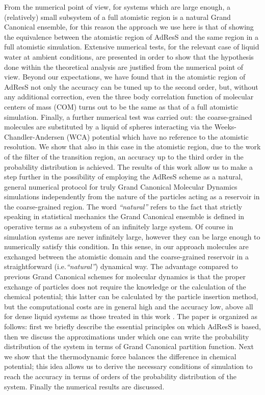 \documentclass[aip,jcp,a4paper,reprint,onecolumn]{revtex4-1}
\begin{document}
From the numerical point of view, for systems which are large enough, a (relatively) small subsystem of a full atomistic region is a 
natural Grand Canonical ensemble, for this reason the approach we use here is that of showing the equivalence between the atomistic region of AdResS and the same region in a full atomistic simulation.
Extensive numerical tests, for the relevant case of liquid water at ambient conditions, are presented in order to show that the hypothesis done within the theoretical analysis are justified from the numerical point of view. Beyond our expectations, we have found that in the atomistic region of AdResS not only the accuracy can be tuned up to the second order, but, without any additional correction, even the three body correlation function of molecular centers of mass (COM) turns out to be the same as that of a full atomistic simulation. Finally, a further numerical test was carried out: the coarse-grained molecules are substituted by a liquid of spheres interacting via the Weeks-Chandler-Andersen (WCA)  potential \cite{wca} which have no reference to the atomistic resolution. We show that also in this case in the atomistic region, due to the work of the filter of the transition region, an accuracy up to the third order in the probability distribution is achieved.
The results of this work allow us to make a step further in the possibility of employing the AdResS scheme as a natural, general numerical protocol for truly Grand Canonical Molecular Dynamics simulations
independently from the nature of the particles acting as a reservoir in the coarse-grained region. The word {\it ``natural''} refers to the fact  that strictly speaking in statistical mechanics the Grand Canonical ensemble is defined in operative terms as a subsystem of an infinitely large system. Of course in simulation systems are never infinitely large, however they can be large enough to numerically satisfy this condition. 
In this sense, in our approach molecules are exchanged between the atomistic domain and the coarse-grained reservoir in a straightforward (i.e.{\it ``natural''}) dynamical way. The advantage compared to previous Grand Canonical schemes for molecular dynamics is that the proper exchange of particles does not require the knowledge or the calculation of the chemical potential; this latter can be calculated by the particle insertion method, but the computational costs are in general high and the accuracy low, above all for dense liquid systems as those treated in this work \cite{pet1,pet2,pet3,pet4,pet5,flo}. 
The paper is organized as follows: first we briefly describe the essential principles on which AdResS is based, then we discuss the approximations under which one can write the probability distribution of the system in terms of Grand Canonical partition function. Next we show that the thermodynamic force balances the difference in chemical potential; this idea allows us to derive the necessary conditions of simulation to reach the accuracy in terms of orders of the probability distribution of the system. 
Finally the numerical results are discussed.
\end{document}
